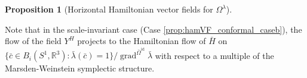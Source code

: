 \documentclass[12pt]{amsart}
\newcommand{\AuthorCOMMENT}[3]{\textcolor{#2}{{[\textbf{#1:} \textsl{#3}}]}}  %
\newcommand{\cSI}[1]{\AuthorCOMMENT{Sadashige}{violet}{#1}}
\newcommand{\rev}[1]{#1}
\newtheorem{proposition}[theorem]{Proposition}
\theoremstyle{definition}
\newcommand{\R}{\mathbb R}
\newcommand{\id}{\mathrm{id}}
\newcommand{\Imm}{\mathrm{Imm}}
\def\la{\lambda}
\def\Om{\Omega}
\def\R{{\mathbb R}}
\let\on=\operatorname
\begin{document}
\begin{proposition}[Horizontal Hamiltonian vector fields for $\Om^{\la}$]
\begin{enumerate}[label=(\alph*)]
\end{enumerate}
\end{proposition}
Note that in the scale-invariant case (Case \ref{prop:hamVF_conformal_caseb}), the flow of the field $Y^H$ projects to the Hamiltonian flow of $\bar H$ on  $\{\bar c\in B_i(S^1,\R^3): \bar\la\rev{(\bar c)}=1\}/\on{grad}^{\bar\Om^\id}\bar\la$ with respect to a multiple of the Marsden-Weinstein symplectic structure. 
\end{document}
